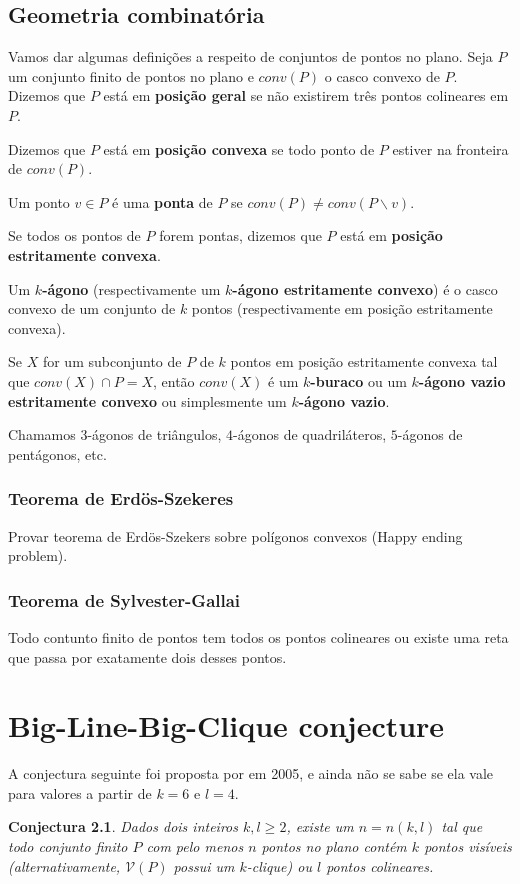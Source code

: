 \documentclass[a4paper]{book}
\newtheorem{conjectura}{Conjectura}
\begin{document}
\section{Geometria combinatória}
Vamos dar algumas definições a respeito de conjuntos de pontos no plano. Seja $P$ um conjunto finito de pontos no plano e $conv(P)$ o casco convexo de $P$. Dizemos que $P$ está em \textbf{posição geral} se não existirem três pontos colineares em $P$. 

Dizemos que $P$ está em \textbf{posição convexa} se todo ponto de $P$ estiver na fronteira de $conv(P)$.

Um ponto $v\in P$ é uma \textbf{ponta} de $P$ se $conv(P)\neq conv(P\backslash v)$.

Se todos os pontos de $P$ forem pontas, dizemos que $P$ está em \textbf{posição estritamente convexa}.

Um \textbf{$k$-ágono} (respectivamente um \textbf{$k$-ágono estritamente convexo}) é o casco convexo de um conjunto de $k$ pontos (respectivamente em posição estritamente convexa).

Se $X$ for um subconjunto de $P$ de $k$ pontos em posição estritamente convexa tal que $conv(X)\cap P=X$, então  $conv(X)$ é um \textbf{$k$-buraco} ou um \textbf{$k$-ágono vazio estritamente convexo} ou simplesmente um \textbf{$k$-ágono vazio}.

Chamamos $3$-ágonos de triângulos, $4$-ágonos de quadriláteros, $5$-ágonos de pentágonos, etc.

\subsection{Teorema de Erdös-Szekeres}
Provar teorema de Erdös-Szekers sobre polígonos convexos (Happy ending problem).

\subsection{Teorema de Sylvester-Gallai}
Todo contunto finito de pontos tem todos os pontos colineares ou existe uma reta que passa por exatamente dois desses pontos.

\chapter{Big-Line-Big-Clique conjecture}
A conjectura seguinte foi proposta por \cite{visibilitygraph} em 2005, e ainda não se sabe se ela vale para valores a partir de  $k=6$ e $l=4$.
\begin{conjectura}\label{conj1}
    Dados dois inteiros $k,l\geq2$, existe um $n=n(k,l)$ tal que todo conjunto finito $P$ com pelo menos $n$ pontos no plano contém $k$ pontos visíveis (alternativamente, $\mathcal V(P)$ possui um $k$-clique) ou $l$ pontos colineares.
\end{conjectura}
\end{document}
